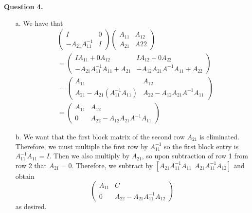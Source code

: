 \documentclass{article}
\begin{document}
\textbf{Question 4.} 
\begin{itemize}
    \item[a.] We have that \begin{align*}
        &\begin{pmatrix}
            I&0\\
            -A_{21}A^{-1}_{11}&I
        \end{pmatrix}
        \begin{pmatrix}
            A_{11}&A_{12}\\
            A_{21}&A{22}
        \end{pmatrix}\\
        &=
        \begin{pmatrix}
            IA_{11}+0A_{12}&IA_{12}+0A_{22}\\
            -A_{21}A^{-1}_{11}A_{11}+A_{21}&-A_{12}A_{21}A^{-1}A_{11}+A_{22}
        \end{pmatrix}\\
        &= 
        \begin{pmatrix}
            A_{11}&A_{12}\\
            A_{21}-A_{21}(A^{-1}_{11}A_{11})&A_{22}-A_{12}A_{21}A^{-1}A_{11}
        \end{pmatrix}\\
        &= \begin{pmatrix}
            A_{11}&A_{12}\\
            0&A_{22}-A_{12}A_{21}A^{-1}A_{11}
        \end{pmatrix}
    \end{align*}
    \item[b.] We want that the first block matrix of the second row $A_{21}$ is eliminated. Therefore, we must multiple the first row by $A_{11}^{-1}$ so the first block entry is $A_{11}^{-1}A_{11}=I$. Then we also multiply by $A_{21}$, so upon subtraction of row 1 from row 2 that $A_{21}=0$. Therefore, we subtract by $[A_{21}A_{11}^{-1}A_{11} \ \ A_{21}A^{-1}_{11}A_{12}]$ and obtain
    \begin{equation*}
        \begin{pmatrix}
            A_{11} & C\\
            0 & A_{22} - A_{21}A^{-1}_{11}A_{12}
        \end{pmatrix}
    \end{equation*} 
    as desired. 
\end{itemize}
\end{document}
